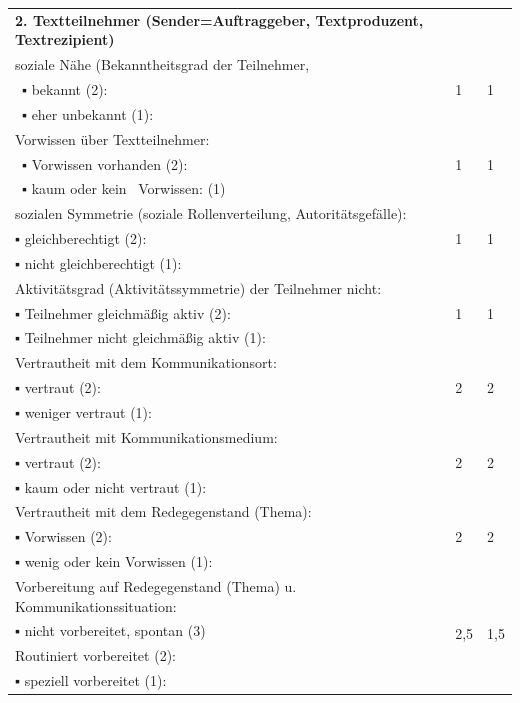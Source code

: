 \documentclass[
  letterpaper,
]{scrbook}
\begin{document}
\begin{longtable}[]{@{}lll@{}}
\textbf{{2. {Textteilnehmer} ({Sender}={Auftraggeber}, {Textproduzent},
{Textrezipient})}} & {~} & {~} \\
{{soziale}}{ {Nähe} ({Bekanntheitsgrad} der {Teilnehmer},} &
\multirow{3}{*}{{1}} & \multirow{3}{*}{{1}} \\
{{~}▪ {bekannt} (2):} \\
{{~}▪ {eher} {unbekannt} (1):} \\
{{Vorwissen}}{ {über} {Textteilnehmer}:} & \multirow{3}{*}{{1}} &
\multirow{3}{*}{{1}} \\
{{~}▪ {Vorwissen} {vorhanden} (2): } \\
{{~}▪ {kaum} oder kein{~ }{Vorwissen}: (1)} \\
{{sozialen}}{ {Symmetrie} ({soziale} {Rollenverteilung},
{Autoritätsgefälle}):} & \multirow{3}{*}{{1}} & \multirow{3}{*}{{1}} \\
{▪ {gleichberechtigt} (2):} \\
{▪ {nicht} {gleichberechtigt} (1):} \\
{{Aktivitätsgrad}}{ ({Aktivitätssymmetrie}) der {Teilnehmer} {nicht}:} &
\multirow{3}{*}{{1}} & \multirow{3}{*}{{1}} \\
{▪ {Teilnehmer} {gleichmäßig} aktiv (2):} \\
{▪ {Teilnehmer} {nicht} {gleichmäßig} aktiv (1):} \\
{{Vertrautheit}}{ mit dem {Kommunikationsort}:} & \multirow{3}{*}{{2}} &
\multirow{3}{*}{{2}} \\
{▪ {vertraut} (2):} \\
{▪ {weniger} {vertraut} (1):} \\
{{Vertrautheit}}{ mit {Kommunikationsmedium}:} & \multirow{3}{*}{{2}} &
\multirow{3}{*}{{2}} \\
{▪ {vertraut} (2):} \\
{▪ {kaum} oder {nicht} {vertraut} (1):} \\
{{Vertrautheit}}{ mit dem {Redegegenstand} ({Thema}):} &
\multirow{3}{*}{{2}} & \multirow{3}{*}{{2}} \\
{▪ {Vorwissen} (2): } \\
{▪ {wenig} oder kein {Vorwissen} (1):} \\
{{Vorbereitung}}{ {auf} {Redegegenstand} ({Thema}) u.
{Kommunikationssituation}:} & \multirow{4}{*}{{2,5}} &
\multirow{4}{*}{{1,5}} \\
{▪ {nicht} {vorbereitet}, spontan (3)} \\
{{Routiniert}}{ {vorbereitet} (2): } \\
{▪ {speziell} {vorbereitet} (1):} \\

\end{longtable}
\end{document}
